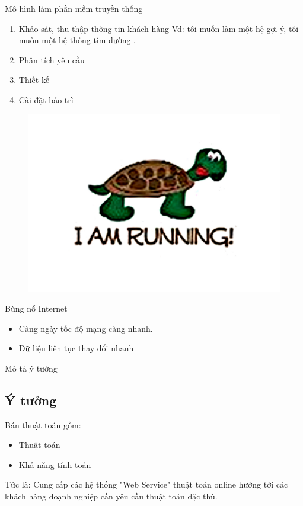 \documentclass{beamer}
\begin{document}
\begin{frame}{Mô hình làm phần mềm truyền thống}
\begin{enumerate}
\item Khảo sát, thu thập thông tin khách hàng Vd: tôi muốn làm một hệ gợi ý, tôi muốn một hệ thống tìm đường .
\item Phân tích yêu cầu 
\item Thiết kế 
\item Cài đặt bảo trì 
\end{enumerate}
\begin{figure}
\begin{center}
\includegraphics[scale=0.5]{3.jpg}
\end{center}

\end{figure}
\end{frame}
\begin{frame}{Bùng nổ Internet}
\begin{itemize}
\item Càng ngày tốc độ mạng càng nhanh.
\item Dữ liệu liên tục thay đổi nhanh
\end{itemize}

\end{frame}
\begin{frame}{Mô tả ý tưởng}
\subsection{Ý tưởng}
Bán thuật toán gồm:
\begin{itemize}
\item Thuật toán 
\item Khả năng tính toán 
\end{itemize}
Tức là: Cung cấp các hệ thống {\color{hilight}"Web Service"} thuật toán online hướng tới các khách hàng doạnh nghiệp cần yêu cầu thuật toán đặc thù.
\end{frame}
\end{document}
